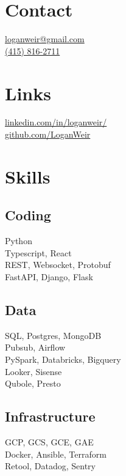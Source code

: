 \begin{minipage}[t]{0.33\textwidth}
  \vspace{0pt}

  \section{Contact}
  \href{mailto:loganweir@gmail.com}{loganweir@gmail.com}\\
  \href{tel:14158162711}{(415) 816-2711}
  \sectionsepright

  \section{Links}
  \href{https://www.linkedin.com/in/loganweir/}{linkedin.com/in/loganweir/}\\
  \href{https://github.com/LoganWeir}{github.com/LoganWeir}
  \sectionsepright

  \section{Skills}

  \subsection{Coding}
  Python\\
  Typescript, React\\
  REST, Websocket, Protobuf\\
  FastAPI, Django, Flask
  \sectionsepright

  \subsection{Data}
  SQL, Postgres, MongoDB\\
  Pubsub, Airflow\\
  PySpark, Databricks, Bigquery\\
  Looker, Sisense\\
  Qubole, Presto
  \sectionsepright

  \subsection{Infrastructure}
  GCP, GCS, GCE, GAE\\
  Docker, Ansible, Terraform\\
  Retool, Datadog, Sentry
  \sectionsepright


\end{minipage}
